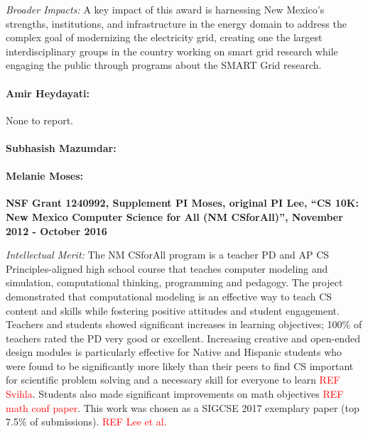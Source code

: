 \noindent\textit{Broader Impacts:} A key impact of this award is harnessing New Mexico's strengths, institutions, and infrastructure in the energy domain to address the complex goal of modernizing the electricity grid, creating one the largest interdisciplinary groups in the country working on smart grid research while engaging the public through programs about the SMART Grid research. 

\paragraph{Amir Heydayati:} None to report.

\paragraph{Subhasish Mazumdar:}

\paragraph{Melanie Moses:}
\textbf{NSF Grant 1240992, Supplement PI Moses, original PI Lee, ``CS 10K: New Mexico Computer Science for All (NM CSforAll)'', November 2012 - October 2016} 

\noindent \textit{Intellectual Merit:} The NM CSforAll program is a teacher PD and AP CS Principles-aligned high school course that teaches computer modeling and simulation, computational thinking, programming and pedagogy. %
The project demonstrated that computational modeling is an effective way to teach CS content and skills while fostering positive attitudes and student engagement.
Teachers and students showed significant increases in learning objectives; 100\% of teachers rated the PD very good or excellent. Increasing creative and open-ended design modules is particularly effective for Native and Hispanic students who were found to be significantly more likely than their peers to find CS important for scientific problem solving and a necessary skill for everyone to learn \textcolor{red}{REF Svihla}. Students also made significant improvements on math objectives \textcolor{red}{REF math conf paper}. This work was chosen as a SIGCSE 2017 exemplary paper (top 7.5\% of submissions). \textcolor{red}{REF Lee et al.}

